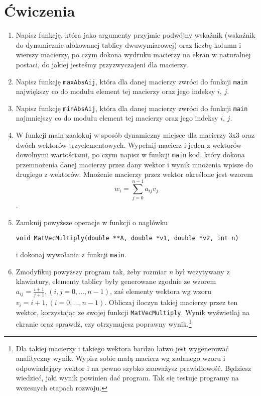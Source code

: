 \documentclass{instrukcja}
\begin{document}
\section*{Ćwiczenia}
\begin{enumerate}
\item Napisz funkcję, która jako argumenty przyjmie podwójny wskaźnik (wskaźnik do dynamicznie alokowanej tablicy dwuwymiarowej) oraz liczbę kolumn i wierszy macierzy, po czym dokona wydruku macierzy na ekran w naturalnej postaci, do jakiej jesteśmy przyzwyczajeni dla macierzy.
\item Napisz funkcję {\tt maxAbsAij}, która dla danej macierzy zwróci do funkcji {\tt main} największy co do modułu element tej macierzy oraz jego indeksy $i$, $j$.
\item Napisz funkcję {\tt minAbsAij}, która dla danej macierzy zwróci do funkcji {\tt main} najmniejszy co do modułu element tej macierzy oraz jego indeksy $i$, $j$.
\item W funkcji main zaalokuj w sposób dynamiczny miejsce dla macierzy 3x3 oraz dwóch wektorów trzyelementowych. Wypełnij macierz i jeden z wektorów dowolnymi wartościami, po czym napisz w funkcji {\tt main} kod, który dokona przemnożenia danej macierzy przez dany wektor i wynik mnożenia wpisze do drugiego z wektorów. Mnożenie macierzy przez wektor określone jest wzorem \begin{equation}w_i = \sum\limits_{j=0}^{n-1}{a_{ij}v_j}\end{equation}.
\item Zamknij powyższe operacje w funkcji o nagłówku \begin{verbatim}void MatVecMultiply(double **A, double *v1, double *v2, int n)\end{verbatim} i dokonaj wywołania z funkcji {\tt main}.
\item Zmodyfikuj powyższy program tak, żeby rozmiar {\it n} był wczytywany z klawiatury, elementy tablicy były generowane zgodnie ze wzorem $a_{ij} = \frac{i+1}{j+1}, (i,j = 0,...,n-1)$, zaś elementy wektora wg wzoru $v_i = i+1, (i = 0,...,n-1)$. Obliczaj iloczyn takiej macierzy przez ten wektor, korzystając ze swojej funkcji {\tt MatVecMultiply}. Wynik wyświetlaj na ekranie oraz sprawdź, czy otrzymujesz poprawny wynik.\footnote{Dla takiej macierzy i takiego wektora bardzo łatwo jest wygenerować analityczny wynik. Wypisz sobie małą macierz wg zadanego wzoru i odpowiadający wektor i na pewno szybko zauważysz prawidłowość. Będziesz wiedzieć, jaki wynik powinien dać program. Tak się testuje programy na wczesnych etapach rozwoju.}

\end{enumerate}
\end{document}
